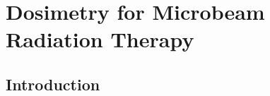 \chapter{Dosimetry for Microbeam Radiation Therapy}


	
	\section{Introduction}
	\label{sec:mrtintro}
	
